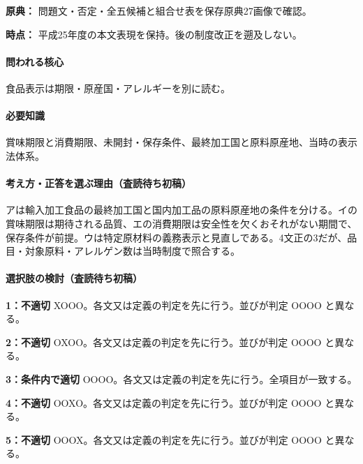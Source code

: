 \noindent\textbf{原典：} 問題文・否定・全五候補と組合せ表を保存原典27画像で確認。\par

\noindent\textbf{時点：} 平成25年度の本文表現を保持。後の制度改正を遡及しない。\par

\paragraph{問われる核心} 食品表示は期限・原産国・アレルギーを別に読む。

\paragraph{必要知識} 賞味期限と消費期限、未開封・保存条件、最終加工国と原料原産地、当時の表示法体系。

\paragraph{考え方・正答を選ぶ理由（査読待ち初稿）} アは輸入加工食品の最終加工国と国内加工品の原料原産地の条件を分ける。イの賞味期限は期待される品質、エの消費期限は安全性を欠くおそれがない期間で、保存条件が前提。ウは特定原材料の義務表示と見直しである。4文正の3だが、品目・対象原料・アレルゲン数は当時制度で照合する。

\paragraph{選択肢の検討（査読待ち初稿）}\mbox{}\par

\noindent\textbf{1：不適切} XOOO。各文又は定義の判定を先に行う。並びが判定 OOOO と異なる。\par

\noindent\textbf{2：不適切} OXOO。各文又は定義の判定を先に行う。並びが判定 OOOO と異なる。\par

\noindent\textbf{3：条件内で適切} OOOO。各文又は定義の判定を先に行う。全項目が一致する。\par

\noindent\textbf{4：不適切} OOXO。各文又は定義の判定を先に行う。並びが判定 OOOO と異なる。\par

\noindent\textbf{5：不適切} OOOX。各文又は定義の判定を先に行う。並びが判定 OOOO と異なる。\par

